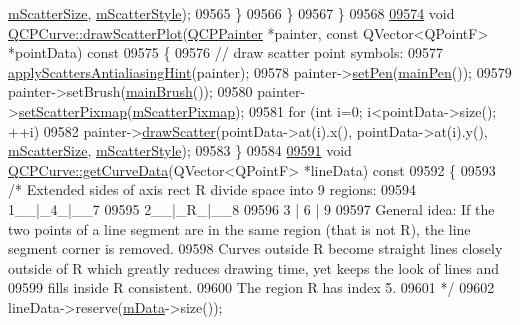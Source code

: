 \begin{DoxyCode}
      \hyperlink{a00028_a504f8e596491386d133de153c73a0777}{mScatterSize}, \hyperlink{a00028_a5700a112cb679dc983648f67151d5cae}{mScatterStyle});
09565     \}
09566   \}
09567 \}
09568 
\hypertarget{a00115_source_l09574}{}\hyperlink{a00028_a45593f30b81beec4b6130b6b53306087}{09574} \textcolor{keywordtype}{void} \hyperlink{a00028_a45593f30b81beec4b6130b6b53306087}{QCPCurve::drawScatterPlot}(\hyperlink{a00047}{QCPPainter} *painter, \textcolor{keyword}{const} 
      QVector<QPointF> *pointData)\textcolor{keyword}{ const}
09575 \textcolor{keyword}{}\{
09576   \textcolor{comment}{// draw scatter point symbols:}
09577   \hyperlink{a00024_a753272ee225a62827e90c3e1e78de4b1}{applyScattersAntialiasingHint}(painter);
09578   painter->\hyperlink{a00047_af9c7a4cd1791403901f8c5b82a150195}{setPen}(\hyperlink{a00024_a19276ed2382a3a06464417b8788b1451}{mainPen}());
09579   painter->setBrush(\hyperlink{a00024_ae74c123832da180c17e22203e748d9b7}{mainBrush}());
09580   painter->\hyperlink{a00047_a0f636de68b40d2e169ab15a8ca067107}{setScatterPixmap}(\hyperlink{a00028_a04103a65b13b2218265e74c567a7061e}{mScatterPixmap});
09581   \textcolor{keywordflow}{for} (\textcolor{keywordtype}{int} i=0; i<pointData->size(); ++i)
09582     painter->\hyperlink{a00047_a3aa145eb9865752d583c40ef995c5049}{drawScatter}(pointData->at(i).x(), pointData->at(i).y(), 
      \hyperlink{a00028_a504f8e596491386d133de153c73a0777}{mScatterSize}, \hyperlink{a00028_a5700a112cb679dc983648f67151d5cae}{mScatterStyle});
09583 \}
09584 
\hypertarget{a00115_source_l09591}{}\hyperlink{a00028_afa895f8ba9ae34fea6ecea295fd7b1e5}{09591} \textcolor{keywordtype}{void} \hyperlink{a00028_afa895f8ba9ae34fea6ecea295fd7b1e5}{QCPCurve::getCurveData}(QVector<QPointF> *lineData)\textcolor{keyword}{ const}
09592 \textcolor{keyword}{}\{
09593   \textcolor{comment}{/* Extended sides of axis rect R divide space into 9 regions:}
09594 \textcolor{comment}{     1\_\_|\_4\_|\_\_7  }
09595 \textcolor{comment}{     2\_\_|\_R\_|\_\_8}
09596 \textcolor{comment}{     3  | 6 |  9 }
09597 \textcolor{comment}{     General idea: If the two points of a line segment are in the same region (that is not R), the line
       segment corner is removed.}
09598 \textcolor{comment}{     Curves outside R become straight lines closely outside of R which greatly reduces drawing time, yet
       keeps the look of lines and}
09599 \textcolor{comment}{     fills inside R consistent.}
09600 \textcolor{comment}{     The region R has index 5.}
09601 \textcolor{comment}{  */}
09602   lineData->reserve(\hyperlink{a00028_a88d533e455bca96004b049e99168731b}{mData}->size());

\end{DoxyCode}
